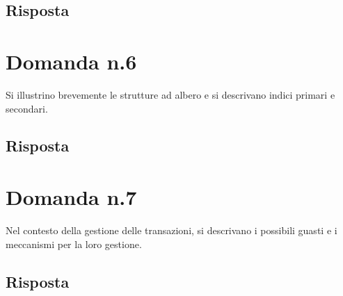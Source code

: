 \documentclass{article}
\begin{document}
\subsection*{Risposta}

\section*{Domanda n.6}
Si illustrino brevemente le strutture ad albero e si descrivano indici primari e secondari.
\subsection*{Risposta}

\section*{Domanda n.7}
Nel contesto della gestione delle transazioni, si descrivano i possibili guasti e i meccanismi per la loro gestione.
\subsection*{Risposta}
\end{document}
